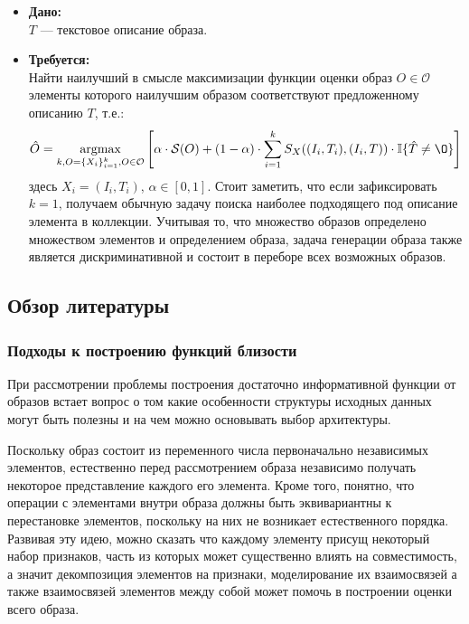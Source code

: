 \documentclass[a4paper,12pt]{article}
\DeclareMathOperator*{\argmax}{argmax}
\begin{document}
				\begin{itemize}
					\item \textbf{Дано:}\\
					$T$ --- текстовое описание образа.
					
					\item \textbf{Требуется:}\\
					Найти наилучший в смысле максимизации функции оценки образ $O\in\mathcal{O}$ элементы которого наилучшим образом соответствуют предложенному описанию $T$, т.е.:
					$$ \hat{O} = \argmax_{k,O = \{X_i\}_{i=1}^{k},  O\in\mathcal{O}} \left[\alpha \cdot \mathcal{S}(O) + (1-\alpha) \cdot \sum\limits_{i=1}^{k} S_X((I_i, T_i), (I_i, T))\cdot\mathbb{I}\{\hat{T}\neq\O\}  \right]$$				
					здесь $X_i = (I_i, T_i)$, $\alpha\in[0,1]$. 
					Стоит заметить, что если зафиксировать $k=1$, получаем обычную задачу поиска наиболее подходящего под описание элемента в коллекции. Учитывая то, что множество образов определено множеством элементов и определением образа, задача генерации образа также является дискриминативной и состоит в переборе всех возможных образов.
				\end{itemize}
			
		\subsection{Обзор литературы}
			\subsubsection{Подходы к построению функций близости}
				При рассмотрении проблемы построения достаточно информативной функции от образов встает вопрос о том какие особенности структуры исходных данных могут быть полезны и на чем можно основывать выбор архитектуры. 
				
				Поскольку образ состоит из переменного числа первоначально независимых элементов, естественно перед рассмотрением образа независимо получать некоторое представление каждого его элемента. Кроме того, понятно, что операции с элементами внутри образа должны быть эквивариантны к перестановке элементов, поскольку на них не возникает естественного порядка. Развивая эту идею, можно сказать что каждому элементу присущ некоторый набор признаков, часть из которых может существенно влиять на совместимость, а значит декомпозиция элементов на признаки, моделирование их взаимосвязей а также взаимосвязей элементов между собой может помочь в построении оценки всего образа. 
				
\end{document}
